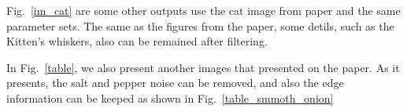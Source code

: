 \documentclass[12pt]{article}
\begin{document}


Fig.~\ref{im_cat} are some other outputs use the cat image from paper and the same parameter sets. 
The same as the figures from the paper, some detils, such as the Kitten's whiskers, also can be remained after filtering.

In Fig.~\ref{table}, we also present another images that presented on the paper. 
As it presents, the salt and pepper noise can be removed, and also the edge information can be keeped as shown in Fig.~\ref{table_smmoth_onion} 


\end{document}

